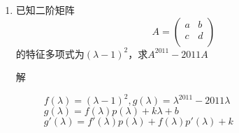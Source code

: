 \begin{enumerate}
\begin{description}
\[\begin{array}{cccc}
2 & 0 & \cdots & n-3 \\
\vdots & \vdots & \ddots & \vdots \\
2n-4 & n-3 & \cdots & 0 \\
\end{array}\right]
\]
分解成两个
\[
-4 \left[
\begin{array}{cccc}
0 & 1 & \cdots & n-2 \\
1 & 0 & \cdots & n-3 \\
\vdots & \vdots & \ddots & \vdots \\
n-2 & n-3 & \cdots & 0 \\
\end{array}\right]-2\left[
\begin{array}{cccc}
2 & 1 & \cdots & n-2 \\
0 & 0 & \cdots & n-3 \\
\vdots & \vdots & \ddots & \vdots \\
0 & n-3 & \cdots & 0 \\
\end{array}\right]
\]
\end{description}

\item 已知二阶矩阵
\[
A=\left(
\begin{array}{cc}
a & b \\
c & d \\
\end{array}\right)
\]
的特征多项式为$(\lambda-1)^2$，求$A^{2011}-2011A$
\begin{description}
\item[解] $f(\lambda) = (\lambda-1)^2,g(\lambda)=\lambda^{2011}-2011\lambda$ \\
$g(\lambda) = f(\lambda)p(\lambda) + k\lambda + b$\\
$g'(\lambda) = f'(\lambda)p(\lambda)+ f(\lambda)p'(\lambda)+ k$\\
\end{description}


\end{enumerate}
